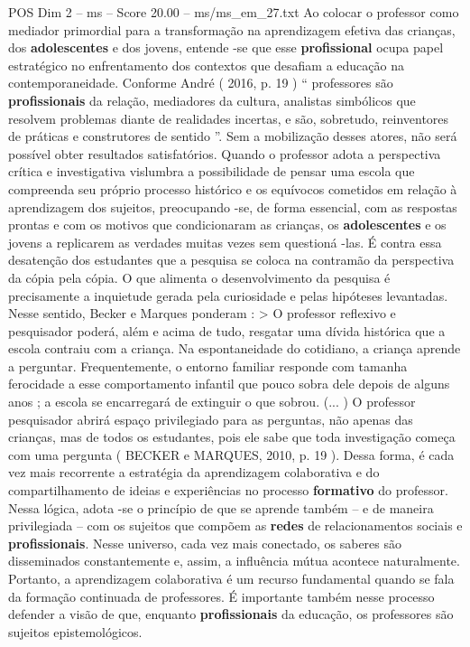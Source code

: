 \begin{textsample}{POS Dim 2 – ms – Score 20.00 – ms/ms\_em\_27.txt}
Ao colocar o professor como mediador primordial para a transformação na aprendizagem efetiva das crianças, dos \textbf{adolescentes} e dos jovens, entende -se que esse \textbf{profissional} ocupa papel estratégico no enfrentamento dos contextos que desafiam a educação na contemporaneidade.
Conforme André ( 2016, p. 19 ) “ professores são \textbf{profissionais} da relação, mediadores da cultura, analistas simbólicos que resolvem problemas diante de realidades incertas, e são, sobretudo, reinventores de práticas e construtores de sentido ”.
Sem a mobilização desses atores, não será possível obter resultados satisfatórios.
Quando o professor adota a perspectiva crítica e investigativa vislumbra a possibilidade de pensar uma escola que compreenda seu próprio processo histórico e os equívocos cometidos em relação à aprendizagem dos sujeitos, preocupando -se, de forma essencial, com as respostas prontas e com os motivos que condicionaram as crianças, os \textbf{adolescentes} e os jovens a replicarem as verdades muitas vezes sem questioná -las.
É contra essa desatenção dos estudantes que a pesquisa se coloca na contramão da perspectiva da cópia pela cópia.
O que alimenta o desenvolvimento da pesquisa é precisamente a inquietude gerada pela curiosidade e pelas hipóteses levantadas.
Nesse sentido, Becker e Marques ponderam : > O professor reflexivo e pesquisador poderá, além e acima de tudo, resgatar uma dívida histórica que a escola contraiu com a criança.
Na espontaneidade do cotidiano, a criança aprende a perguntar.
Frequentemente, o entorno familiar responde com tamanha ferocidade a esse comportamento infantil que pouco sobra dele depois de alguns anos ; a escola se encarregará de extinguir o que sobrou. (... ) O professor pesquisador abrirá espaço privilegiado para as perguntas, não apenas das crianças, mas de todos os estudantes, pois ele sabe que toda investigação começa com uma pergunta ( BECKER e MARQUES, 2010, p. 19 ).
Dessa forma, é cada vez mais recorrente a estratégia da aprendizagem colaborativa e do compartilhamento de ideias e experiências no processo \textbf{formativo} do professor.
Nessa lógica, adota -se o princípio de que se aprende também – e de maneira privilegiada – com os sujeitos que compõem as \textbf{redes} de relacionamentos sociais e \textbf{profissionais}.
Nesse universo, cada vez mais conectado, os saberes são disseminados constantemente e, assim, a influência mútua acontece naturalmente.
Portanto, a aprendizagem colaborativa é um recurso fundamental quando se fala da formação continuada de professores.
É importante também nesse processo defender a visão de que, enquanto \textbf{profissionais} da educação, os professores são sujeitos epistemológicos.

\end{textsample}

